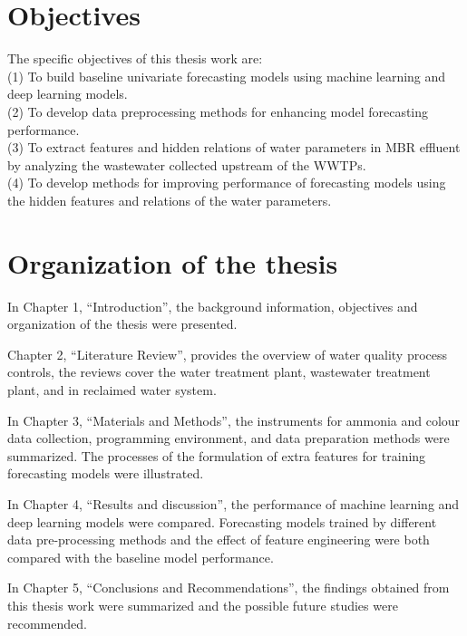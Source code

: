 \section{Objectives}
\noindent
The specific objectives of this thesis work are:\\
(1) To build baseline univariate forecasting models using machine learning and deep learning models.\\
(2) To develop data preprocessing methods for enhancing model forecasting performance.\\
(3) To extract features and hidden relations of water parameters in MBR effluent by analyzing the wastewater collected upstream of the WWTPs.\\
(4) To develop methods for improving performance of forecasting models using the hidden features and relations of the water parameters.

\section{Organization of the thesis}
In Chapter 1, “Introduction”, the background information, objectives and organization of the thesis were presented.

Chapter 2, “Literature Review”, provides the overview of water quality process controls, the reviews cover the water treatment plant, wastewater treatment plant, and in reclaimed water system.

In Chapter 3, “Materials and Methods”, the instruments for ammonia and colour data collection, programming environment, and data preparation methods were summarized. The processes of the formulation of extra features for training forecasting models were illustrated.

In Chapter 4, “Results and discussion”, the performance of machine learning and deep learning models were compared. Forecasting models trained by different data pre-processing methods and the effect of feature engineering were both compared with the baseline model performance. 

In Chapter 5, “Conclusions and Recommendations”, the findings obtained from this thesis work were summarized and the possible future studies were recommended.
